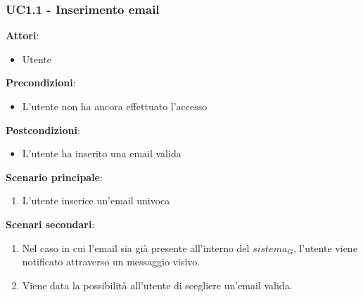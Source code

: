 \subsubsection{UC1.1 - Inserimento email}\label{usecase:1_1}
\textbf{Attori}:
\begin{itemize}
    \item Utente
\end{itemize}
\textbf{Precondizioni}:
\begin{itemize}
    \item L'utente non ha ancora effettuato l'accesso
\end{itemize}
\textbf{Postcondizioni}:
\begin{itemize}
    \item L'utente ha inserito una email valida
\end{itemize}
\textbf{Scenario principale}:
\begin{enumerate}
    \item L'utente inserice un'email univoca
\end{enumerate}
\textbf{Scenari secondari}:
\begin{enumerate}
    \item Nel caso in cui l'email sia già presente all'interno del $\textit{sistema}_G$, l'utente viene notificato attraverso un messaggio visivo.
    \item Viene data la possibilità all'utente di scegliere un'email valida.
\end{enumerate}